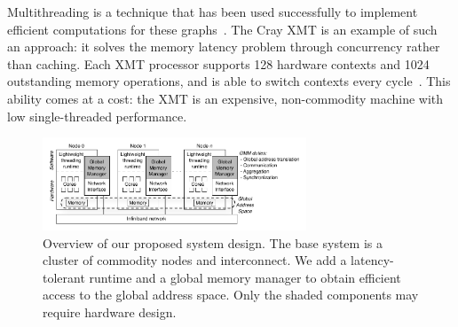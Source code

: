 \documentclass[10pt,nocopyrightspace]{sigplanconf}
\begin{document}






Multithreading is a technique that has been used successfully to
implement efficient computations for these
graphs~\cite{bader:bfsmta}. The Cray {\small XMT} is an example of such an
approach: it solves the memory latency problem through concurrency
rather than caching. Each {\small XMT} processor supports 128 hardware contexts
and 1024 outstanding memory operations, and is able to switch contexts
every cycle~\cite{tera, feo-xmt}. This ability comes at a cost: the
{\small XMT} is an expensive, non-commodity machine with low
single-threaded performance.

\begin{figure}[htbp]
  \begin{center}
    \vspace{-0.25in}
    \includegraphics[width=0.7\textwidth]{figures/system-overview.pdf}
    \vspace{-0.1in}
	\end{center}
	\caption{Overview of our proposed system design. The base
          system is a cluster of commodity nodes and interconnect. We
          add a latency-tolerant runtime and a global memory manager
          to obtain efficient access to the global address space. Only
          the shaded components may require hardware design.}
	\label{fig:system-overview}
\end{figure}
\end{document}
